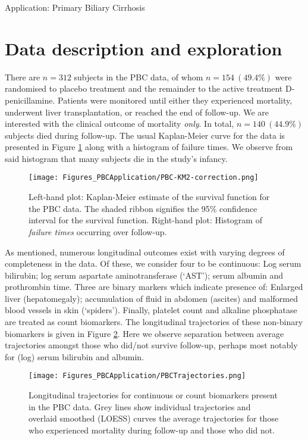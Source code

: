 \begin{chapter}{\label{cha:app-PBC}Application: Primary Biliary Cirrhosis}
  \section{Data description and exploration}\label{sec:pbc-eda}
  There are $n=312$ subjects in the PBC data, of whom $n=154\ (49.4\%)$ were randomised to placebo treatment and the remainder to the active treatment D-penicillamine. Patients were monitored until either they experienced mortality, underwent liver transplantation, or reached the end of follow-up. We are interested with the clinical outcome of mortality \textit{only}. In total, $n=140\ (44.9\%)$ subjects died during follow-up. The usual Kaplan-Meier curve for the data is presented in Figure \ref{fig:pbc-survival-KM} along with a histogram of failure times. We observe from said histogram that many subjects die in the study's infancy.

  \begin{figure}[ht]
      \centering
      \texttt{[image: Figures\_PBCApplication/PBC-KM2-correction.png]}
      \caption{Left-hand plot: Kaplan-Meier estimate of the survival function for the PBC data. The shaded ribbon signifies the 95\% confidence interval for the survival function. Right-hand plot: Histogram of \textit{failure times} occurring over follow-up.}
      \label{fig:pbc-survival-KM}
  \end{figure}

  As mentioned, numerous longitudinal outcomes exist with varying degrees of completeness in the data. Of these, we consider four to be continuous: Log serum bilirubin; log serum aspartate aminotransferase (`AST'); serum albumin and prothrombin time. Three are binary markers which indicate presence of: Enlarged liver (hepatomegaly); accumulation of fluid in abdomen (ascites) and malformed blood vessels in skin (`spiders'). Finally, platelet count and alkaline phosphatase are treated as count biomarkers. The longitudinal trajectories of these non-binary biomarkers is given in Figure \ref{fig:pbc-longitudinal-nonbin}. Here we observe separation between average trajectories amongst those who did/not survive follow-up, perhaps most notably for (log) serum bilirubin and albumin.

  \begin{figure}[ht]
      \centering
      \texttt{[image: Figures\_PBCApplication/PBCTrajectories.png]}
      \caption{Longitudinal trajectories for continuous or count biomarkers present in the PBC data. Grey lines show individual trajectories and overlaid smoothed (LOESS) curves the average trajectories for those who experienced mortality during follow-up and those who did not.}
      \label{fig:pbc-longitudinal-nonbin}
  \end{figure}


\end{chapter}
